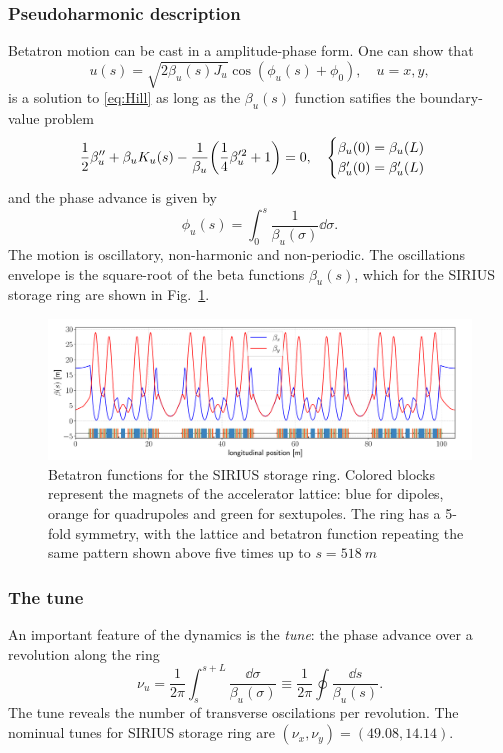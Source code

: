 \subsubsection{Pseudoharmonic description}
Betatron motion can be cast in a amplitude-phase form. One can show that
\begin{equation}
    u(s) = \sqrt{2\beta_u(s) J_u}\cos(\phi_u(s) + \phi_0),\quad u=x,y,
    \label{eq:pseudo_harmon}
\end{equation}
is a solution to \eqref{eq:Hill} as long as the $\beta_u(s)$ function satifies the boundary-value problem
\begin{equation}
    \frac{1}{2}\beta_{u}^{\prime\prime}+\beta_{u} K_u(s) - \frac{1}{\beta_{u}}\qty(\frac{1}{4}\beta_{u}^{\prime 2} + 1 ) = 0, \quad
        \begin{cases}
            \beta_{u}(0) = \beta_{u}(L)\\ \beta_{u}^{\prime}(0) = \beta_{u}^{\prime}(L)
        \end{cases}
    \label{eq:beta_eq}
\end{equation}
and the phase advance is given by
    \begin{equation}
        \phi_u(s) = \int_{0}^{s}\frac{1}{\beta_u(\sigma)}\dd\sigma.
   \end{equation}
The motion is oscillatory, non-harmonic and non-periodic. The oscillations envelope is the square-root of the beta functions $\beta_u(s)$, which for the SIRIUS storage ring are shown in Fig.~\ref{betafunc}.
\begin{figure}[htb]
    \centering
    \includegraphics[width=\textwidth]{Images/beta_functions.pdf}
    \caption{Betatron functions for the SIRIUS storage ring. Colored blocks represent the magnets of the accelerator lattice: blue for dipoles, orange for quadrupoles and green for sextupoles. The ring has a 5-fold symmetry, with the lattice and betatron function repeating the same pattern shown above five times up to $s=518~\unit{m}$}
    \label{betafunc}
\end{figure}
\subsubsection{The tune}
An important feature of the dynamics is the \textit{tune}: the phase advance over a revolution along the ring
\begin{equation*}
    \nu_u=\frac{1}{2\pi}\int_{s}^{s+L}\frac{\dd \sigma}{\beta_u(\sigma)}\equiv\frac{1}{2\pi}\oint\frac{\dd s}{\beta_u(s)}.
\end{equation*}
The tune reveals the number of transverse oscilations per revolution. The nominual tunes for SIRIUS storage ring are $(\nu_x, \nu_y)=(49.08, 14.14)$.

